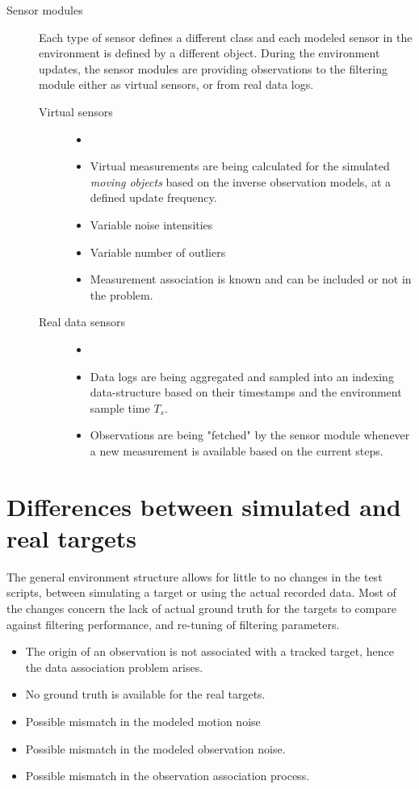 \begin{description}
	\item[Sensor modules] Each type of sensor defines a different class and each modeled sensor in the environment is defined by a different object. During the environment updates, the sensor modules are providing observations to the filtering module either as virtual sensors, or from real data logs.
	\begin{description}
		\item[Virtual sensors]
		\begin{itemize}
			\item[]
			\item Virtual measurements are being calculated for the simulated \emph{moving objects} based on the inverse observation models, at a defined update frequency.
			\item Variable noise intensities
			\item Variable number of outliers
			\item Measurement association is known and can be included or not in the problem.
		\end{itemize}
		\item[Real data sensors]
				\begin{itemize}
					\item[]
					\item Data logs are being aggregated and sampled into an indexing data-structure based on their timestamps and the environment sample time $T_s$.
					\item Observations are being "fetched" by the sensor module whenever a new measurement is available based on the current steps.
				\end{itemize}
		
	\end{description}
\end{description}

	
	
\section{Differences between simulated and real targets}

The general environment structure allows for little to no changes in the test scripts, between simulating a target or using the actual recorded data. Most of the changes concern the lack of actual ground truth for the targets to compare against filtering performance, and re-tuning of filtering parameters.
\begin{itemize}
	\item  The origin of an observation is not associated with a tracked target, hence the data association problem arises.
	\item No ground truth is available for the real targets.
	\item Possible mismatch in the modeled motion noise 
	\item Possible mismatch in the modeled observation noise.
	\item Possible mismatch in the observation association process.
\end{itemize}
